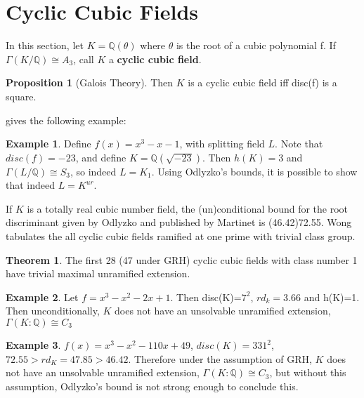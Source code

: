 \documentclass[12pt]{extarticle}
\newcommand{\Q}{\mathbb{Q}}
\newcommand{\<}{\langle}
\renewcommand{\>}{\rangle}
\theoremstyle{definition}
\newtheorem{theorem}{Theorem}
\newtheorem{proposition}{Proposition}
\newtheorem*{example}{Example}
\begin{document}
 \section{Cyclic Cubic Fields}
In this section, let $K=\Q(\theta)$ where $\theta$ is the root of a cubic polynomial 
f. If $\Gamma(K/\Q) \cong A_3$, call $K$ a  \textbf{cyclic cubic field}.
\begin{proposition}[Galois Theory]
Then $K$ is a cyclic cubic field iff disc(f) is a square. 

\cite{SERR} gives the following example:
\begin{example}
Define $f(x) = x^3-x-1$, with splitting field $L$. Note that $disc(f)=-23$, and define $K=\Q(\sqrt{-23})$. Then $h(K)=3$ and $\Gamma(L/\Q) \cong S_3$, so indeed $L=K_1$. Using Odlyzko's bounds, it is possible to show that indeed $L = K^{ur}$.
\end{example}

\end{proposition} If $K$ is a totally real cubic number field, the (un)conditional bound for the root discriminant given by Odlyzko and published by Martinet is (46.42)72.55. Wong tabulates the all cyclic cubic fields ramified at one prime with trivial class group. 
\begin{theorem}
The first 28 (47 under GRH) cyclic cubic fields with class number 1 have trivial maximal unramified extension.
\end{theorem}
\begin{example}
    Let $f=x^3-x^2-2x+1$. Then disc(K)=$7^2$, $rd_{k}=3.66$ and h(K)=1. Then unconditionally, $K$ does not have an unsolvable unramified extension, $\Gamma(K:\mathbb{Q})\cong C_3$
\end{example}
\begin{example}
    $f(x)=x^3 -x^2 -110x +49$, $disc(K)=331^2$, $72.55 > rd_{K}=47.85 > 46.42$. Therefore under the assumption of GRH, $K$ does not have an unsolvable unramified extension, $\Gamma(K:\mathbb{Q})\cong C_3$, but without this assumption, Odlyzko's bound is not strong enough to conclude this.
\end{example}
\end{document}
